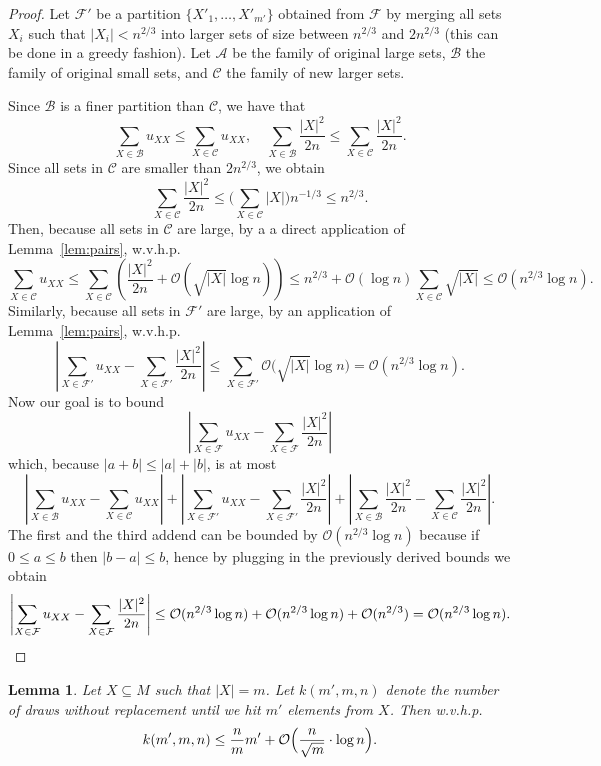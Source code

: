 \documentclass{article}[11pt,a4paper]
\newtheorem{lemma}[definition]{Lemma}
\newcommand{\bigo}{\mathcal{O}}
\begin{document}
\begin{proof}
Let $\mathcal{F}'$ be a partition $\{X'_1,\ldots,{X'}_{m'}\}$ obtained from $\mathcal{F}$ by merging all sets $X_i$ such that $|X_i| < n^{2/3}$ into larger sets of size between $n^{2/3}$ and $2n^{2/3}$ (this can be done in a greedy fashion). Let $\mathcal{A}$ be the family of original large sets, $\mathcal{B}$ the family of original small sets, and $\mathcal{C}$ the family of new larger sets.

Since $\mathcal{B}$ is a finer partition than $\mathcal{C}$, we have that
\[\sum_{X \in \mathcal{B}} u_{XX} \le \sum_{X \in \mathcal{C}} u_{XX},\quad
\sum_{X \in \mathcal{B}} \frac{|X|^2}{2n} \le \sum_{X \in \mathcal{C}} \frac{|X|^2}{2n}.\]
Since all sets in $\mathcal{C}$ are smaller than $2n^{2/3}$, we obtain
\[\sum_{X \in \mathcal{C}} \frac{|X|^2}{2n} \le \biggl(\sum_{X \in \mathcal{C}} |X|\biggr) n^{-1/3} \le n^{2/3}.\]
Then, because all sets in $\mathcal{C}$ are large, by a a direct application of Lemma~\ref{lem:pairs}, w.v.h.p.
\[\sum_{X \in \mathcal{C}} u_{XX} \le \sum_{X \in \mathcal{C}} \left(\frac{|X|^2}{2n} + \bigo(\sqrt{|X|}\log n)\right) \le  n^{2/3} + \bigo(\log n) \sum_{X\in \mathcal{C}} \sqrt{|X|} \leq \bigo(n^{2/3}\log n).\]
Similarly, because all sets in $\mathcal{F}'$ are large, by an application of Lemma~\ref{lem:pairs}, w.v.h.p.
\[\left|\sum_{X \in \mathcal{F'}} u_{XX} - \sum_{X \in \mathcal{F'}} \frac{|X|^2}{2n}\right| \le \sum_{X \in \mathcal{F'}} \bigo\bigl(\sqrt{|X|} \log n\bigr)  = \bigo(n^{2/3} \log n).\]
Now our goal is to bound
\[\left|\sum_{X \in \mathcal{F}} u_{XX} - \sum_{X \in \mathcal{F}} \frac{|X|^2}{2n}\right|\]
which, because $|a+b| \leq |a|+|b|$, is at most
\[\left|\sum_{X \in \mathcal{B}} u_{XX} - \sum_{X \in \mathcal{C}} u_{XX}\right| + \left|\sum_{X \in \mathcal{F'}} u_{XX} - \sum_{X \in \mathcal{F'}} \frac{|X|^2}{2n}\right| + \left|\sum_{X \in \mathcal{B}} \frac{|X|^2}{2n} - \sum_{X \in \mathcal{C}} \frac{|X|^2}{2n}\right|.\]
The first and the third addend can be bounded by $\bigo(n^{2/3}\log n)$ because if $0\leq a\leq b$ then $|b-a|\leq b$, hence by plugging in the previously derived bounds we obtain
\[\left|\sum_{X \in \mathcal{F}} u_{XX} - \sum_{X \in \mathcal{F}} \frac{|X|^2}{2n}\right| \leq \bigo(n^{2/3}\log n) + \bigo(n^{2/3}\log n) + \bigo(n^{2/3}) = \bigo(n^{2/3}\log n).\qedhere\]
\end{proof}

\begin{lemma}
\label{lem:drawing_until}
Let $X \subseteq M$ such that $|X|=m$. Let $k(m',m,n)$ denote the number of draws without replacement until we hit $m'$ elements from $X$. Then w.v.h.p.
\[k(m',m,n) \le \frac{n}{m}m' + \bigo\Bigl(\frac{n}{\sqrt{m}} \cdot \log n\Bigr).\]
\end{lemma}
\end{document}
